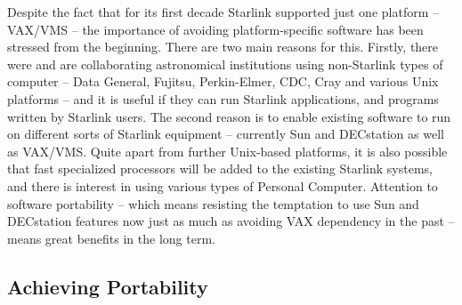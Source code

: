 \documentclass[twoside,11pt]{article}
\renewcommand{\_}{{\tt\char'137}}
\begin{document}
Despite the fact that for its first decade Starlink supported just
one platform -- VAX/VMS -- the importance of avoiding platform-specific
software has been stressed from the beginning.  There are two main
reasons for this.  Firstly, there were and are
collaborating astronomical institutions using non-Starlink types
of computer -- Data General, Fujitsu, Perkin-Elmer, CDC, Cray and various
Unix platforms -- and it is useful if they can run Starlink applications,
and programs written by Starlink users.
The second reason is to enable existing
software to run on different sorts of Starlink equipment -- currently
Sun and DECstation as well as VAX/VMS.  Quite apart from further
Unix-based platforms,
it is also possible that fast specialized processors will be added to
the existing Starlink systems, and there is interest in using
various types of Personal Computer.  Attention
to software portability -- which means resisting the temptation
to use Sun and DECstation features now
just as much as avoiding VAX dependency in the past -- means great
benefits in the long term.

\subsection{Achieving Portability}
\end{document}
